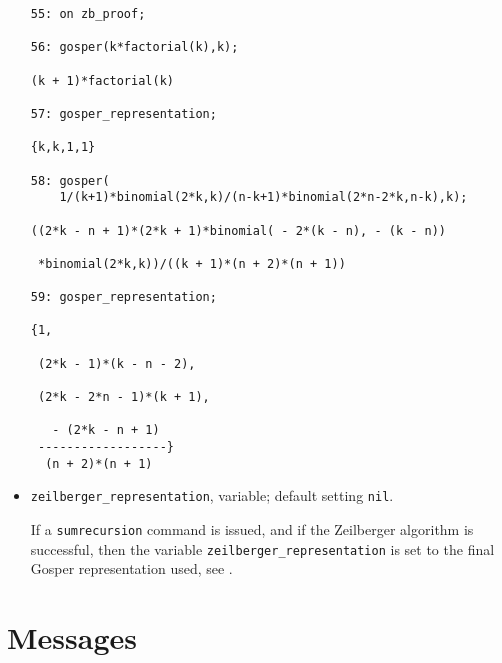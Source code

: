 \begin{itemize}
{\small
\begin{verbatim}
55: on zb_proof;

56: gosper(k*factorial(k),k);

(k + 1)*factorial(k)

57: gosper_representation;

{k,k,1,1}

58: gosper(
    1/(k+1)*binomial(2*k,k)/(n-k+1)*binomial(2*n-2*k,n-k),k);

((2*k - n + 1)*(2*k + 1)*binomial( - 2*(k - n), - (k - n))

 *binomial(2*k,k))/((k + 1)*(n + 2)*(n + 1))

59: gosper_representation;

{1,

 (2*k - 1)*(k - n - 2),

 (2*k - 2*n - 1)*(k + 1),

   - (2*k - n + 1)
 ------------------}
  (n + 2)*(n + 1)
\end{verbatim}
}\noindent
\item
{\tt zeilberger\verb+_+representation}, variable; default setting {\tt nil}.

If a {\tt sumrecursion} command is issued, and if the Zeilberger
algorithm is successful, then the variable
{\tt zeilberger\verb+_+representation} is set to the final Gosper
representation used, see \cite{Koornwinder}.
\end{itemize}

\section{Messages}

